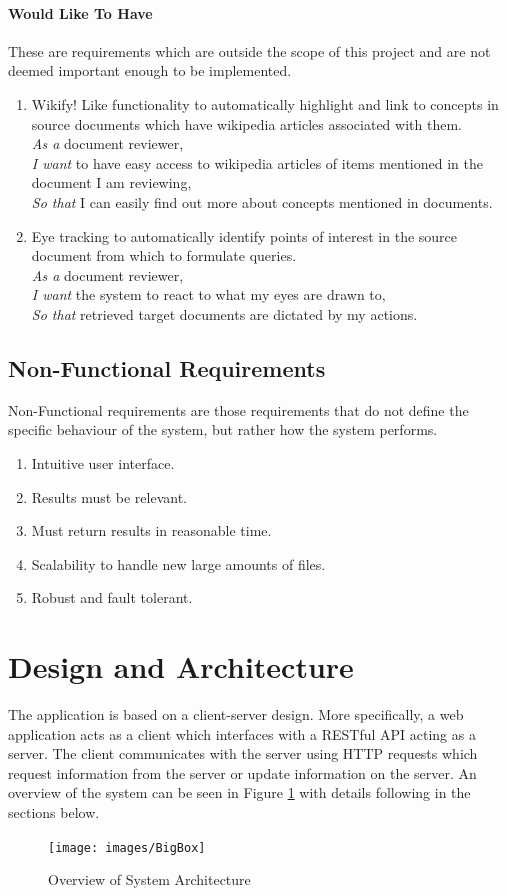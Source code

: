 \documentclass{l4proj}
\begin{document}
\paragraph{Would Like To Have}
These are requirements which are outside the scope of this project and are not deemed important enough to be implemented.
\begin{enumerate}[label=\textbf{W.\arabic*}]
\item Wikify! Like functionality to automatically highlight and link to concepts in source documents which have wikipedia articles associated with them. \\
\textit{As a} document reviewer, \\
\textit{I want} to have easy access to wikipedia articles of items mentioned in the document I am reviewing, \\
\textit{So that} I can easily find out more about concepts mentioned in documents.
\item Eye tracking to automatically identify points of interest in the source document from which to formulate queries. \\
\textit{As a} document reviewer, \\
\textit{I want} the system to react to what my eyes are drawn to, \\
\textit{So that} retrieved target documents are dictated by my actions.
\end{enumerate}
\subsection{Non-Functional Requirements}
Non-Functional requirements are those requirements that do not define the specific behaviour of the system, but rather how the system performs.
\begin{enumerate}[label=\textbf{NF.\arabic*}]
\item Intuitive user interface.
\item Results must be relevant.
\item Must return results in reasonable time.
\item Scalability to handle new large amounts of files. 
\item Robust and fault tolerant.
\end{enumerate}

\section{Design and Architecture}
The application is based on a client-server design. More specifically, a web application acts as a client which interfaces with a RESTful API acting as a server.
The client communicates with the server using HTTP requests which request information from the server or update information on the server. An overview of the system can be seen in Figure \ref{architecture} with details following in the sections below.
\begin{figure}[H]
\centering
\texttt{[image: images/BigBox]}
\caption{Overview of System Architecture}
\label{architecture}
\end{figure}
\end{document}
